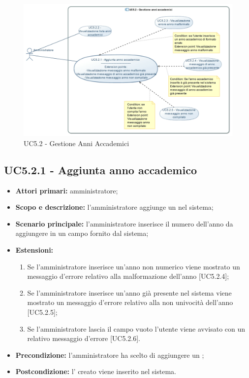 \documentclass[AnalisiDeiRequisiti.tex]{subfiles}
\begin{document}
\begin{figure}[H]
	\centering
	\includegraphics[width=1.0\linewidth]{UC5_2.jpg}
	\caption{UC5.2 - Gestione Anni Accademici}
	\label{fig:UC5.2 - Gestione Anni Accademici}
\end{figure}

\subsection{UC5.2.1 - Aggiunta anno accademico}
\begin{itemize}
	\item \textbf{Attori primari:} amministratore;
	\item \textbf{Scopo e descrizione:} l'amministratore aggiunge un  nel sistema;
	\item \textbf{Scenario principale:} l'amministratore inserisce il numero dell'anno da aggiungere in un campo fornito dal sistema;
	\item \textbf{Estensioni:}
	\begin{enumerate}
		\item Se l'amministratore inserisce un'anno non numerico viene mostrato un messaggio d'errore relativo alla malformazione dell'anno [UC5.2.4];
		\item Se l'amministratore inserisce un'anno già presente nel sistema viene mostrato un messaggio d'errore relativo alla non univocità dell'anno [UC5.2.5];
		\item Se l'amministratore lascia il campo vuoto l'utente viene avvisato con un relativo messaggio d'errore [UC5.2.6].
	\end{enumerate}
	\item \textbf{Precondizione:} l'amministratore ha scelto di aggiungere un ; 
	\item \textbf{Postcondizione:} l' creato viene inserito nel sistema.
\end{itemize}
\end{document}
